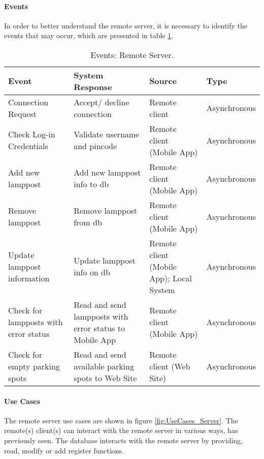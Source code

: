 \paragraph*{Events}
In order to better understand the remote server, it is necessary to identify the events that may occur, which are presented in table \ref{table:rs_events}.

\begin{table}[ht]
	\centering
	\resizebox{\columnwidth}{!}
	{
		\begin{tabular}{|m{3cm}|m{5cm}|m{2.4cm}|m{2.4cm}|}
			\hline
			\textbf{Event} & \textbf{System Response} & \textbf{Source} & \textbf{Type}\\
			\hline\hline
	
			Connection Request & Accept/ decline connection & Remote client & Asynchronous\\\hline
			
			Check Log-in Credentials & Validate username and pincode & Remote client (Mobile App) & Asynchronous\\\hline
			
			Add new lamppost & Add new lamppost info to \ac{db} & Remote client (Mobile App) & Asynchronous\\\hline
			
			Remove lamppost & Remove lamppost from \ac{db} & Remote client (Mobile App) & Asynchronous\\\hline
			
			Update lamppost information & Update lamppost info on \ac{db} & Remote client (Mobile App); Local System & Asynchronous\\\hline
			
			Check for lampposts with error status & Read and send lampposts with error status to Mobile App & Remote client (Mobile App) &  Asynchronous\\\hline
			
			Check for empty parking spots & Read and send available parking spots to Web Site & Remote client (Web Site) & Asynchronous\\\hline
		\end{tabular}
	}
	\caption{Events: Remote Server.}
	\label{table:rs_events}
\end{table}

\paragraph*{Use Cases}
The remote server use cases are shown in figure \ref{fig:UseCases_Server}. The remote(s) client(s) can interact with the remote server in various ways, has previously seen. The database interacts with the remote server by providing, read, modify or add register functions.

